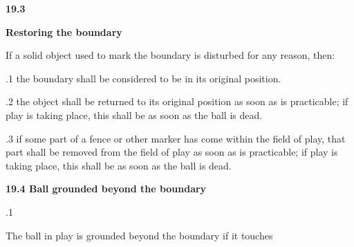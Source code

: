 \documentclass[12pt]{article}
\begin{document}
\vspace{\baselineskip}
{\fontsize{11pt}{13.2pt}\selectfont \textbf{19.3 \tabto{0.47in} }{\fontsize{10pt}{12.0pt}\selectfont \textbf{Restoring the boundary}\par}\par}\par


\vspace{\baselineskip}
{\fontsize{9pt}{10.8pt}\selectfont If a solid object used to mark the boundary is disturbed for any reason, then:\par}\par


\vspace{\baselineskip}
{\fontsize{9pt}{10.8pt}.1 \tabto{0.49in} the boundary shall be considered to be in its original position.\par}\par


\vspace{\baselineskip}
\begin{adjustwidth}{0.5in}{0.11in}
{\fontsize{9pt}{10.8pt}.2 \tabto{0.49in} the object shall be returned to its original position as soon as is practicable; if play is taking place, this shall be as soon as the ball is dead.\par}\par

\end{adjustwidth}


\vspace{\baselineskip}
\begin{adjustwidth}{0.5in}{0.06in}
{\fontsize{9pt}{10.8pt}.3 \tabto{0.49in} if some part of a fence or other marker has come within the field of play, that part shall be removed from the field of play as soon as is practicable; if play is taking place, this shall be as soon as the ball is dead.\par}\par

\end{adjustwidth}


\vspace{\baselineskip}
{\fontsize{11pt}{13.2pt}\selectfont \textbf{19.4 \tabto{0.47in} Ball grounded beyond the boundary}\par}\par


\vspace{\baselineskip}
{\fontsize{9pt}{10.8pt}.1 \tabto{0.49in} {\fontsize{8pt}{9.6pt}\selectfont The ball in play is grounded beyond the boundary if it touches\par}\par}\par
\end{document}
